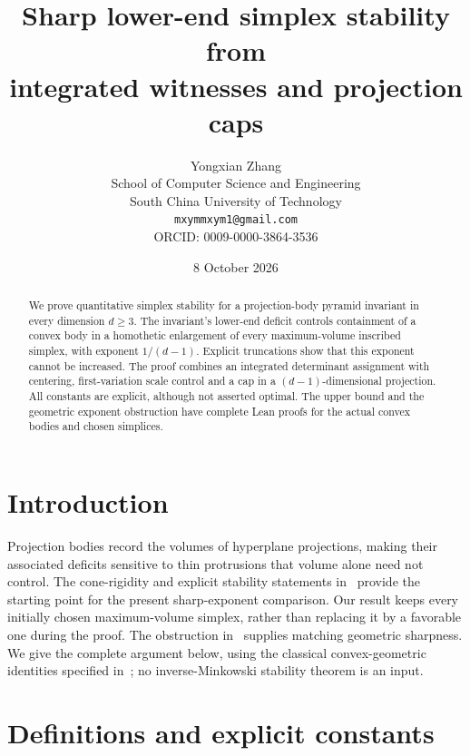 \documentclass[11pt]{article}
\title{Sharp lower-end simplex stability from\\integrated witnesses and projection caps}
\author{Yongxian Zhang\\[2pt]\small School of Computer Science and Engineering\\\small South China University of Technology\\\small\texttt{mxymmxym1@gmail.com}\\\small ORCID: 0009-0000-3864-3536}
\date{8 October 2026}
\begin{document}
\maketitle

\begin{abstract}
We prove quantitative simplex stability for a projection-body pyramid
invariant in every dimension $d\ge3$. The invariant's lower-end deficit
controls containment of a convex body in a homothetic enlargement of
every maximum-volume inscribed simplex, with exponent $1/(d-1)$.
Explicit truncations show that this exponent cannot be increased.
The proof combines an integrated determinant assignment with centering,
first-variation scale control and a cap in a $(d-1)$-dimensional
projection. All constants are explicit, although not asserted optimal.
The upper bound and the geometric exponent obstruction have complete
Lean proofs for the actual convex bodies and chosen simplices.
\end{abstract}

\section*{Introduction}
Projection bodies record the volumes of hyperplane projections, making
their associated deficits sensitive to thin protrusions that volume
alone need not control. The cone-rigidity and explicit stability
statements in~\cite{entry,released} provide the starting point for the
present sharp-exponent comparison. Our result keeps every initially
chosen maximum-volume simplex, rather than replacing it by a favorable
one during the proof. The obstruction in~\cite{truncation} supplies
matching geometric sharpness. We give the complete argument below,
using the classical convex-geometric identities specified
in~\cite{classical}; no inverse-Minkowski stability theorem is an input.

\section{Definitions and explicit constants}
\end{document}
